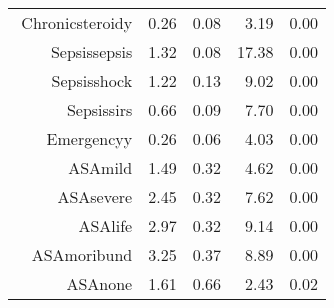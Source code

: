 \begin{tabular}{rrrrr}
$$  Chronic\-steroid\-y & 0.26 & 0.08 & 3.19 & 0.00 \\ 
  Sepsis\-sepsis & 1.32 & 0.08 & 17.38 & 0.00 \\ 
  Sepsis\-shock & 1.22 & 0.13 & 9.02 & 0.00 \\ 
  Sepsis\-sirs & 0.66 & 0.09 & 7.70 & 0.00 \\ 
  Emergency\-y & 0.26 & 0.06 & 4.03 & 0.00 \\ 
  ASA\-mild & 1.49 & 0.32 & 4.62 & 0.00 \\ 
  ASA\-severe & 2.45 & 0.32 & 7.62 & 0.00 \\ 
  ASA\-life & 2.97 & 0.32 & 9.14 & 0.00 \\ 
  ASA\-moribund & 3.25 & 0.37 & 8.89 & 0.00 \\ 
  ASA\-none & 1.61 & 0.66 & 2.43 & 0.02 \\ 
   \hline
\end{tabular}


